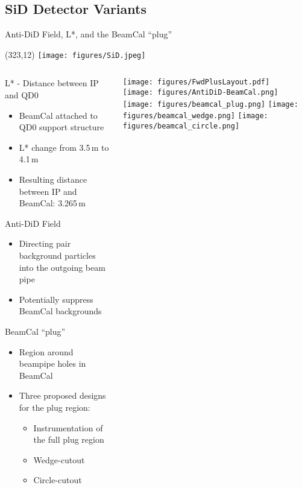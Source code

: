 \documentclass[xcolor={dvipsnames}]{beamer}
\newcommand{\sidlogo}{
  \setlength{\TPHorizModule}{1pt}
  \setlength{\TPVertModule}{1pt}
  \begin{textblock}{1}(323,12)
   \texttt{[image: figures/SiD.jpeg]}
  \end{textblock}
  }
\begin{document}

\subsection{SiD Detector Variants}
\begin{frame}{Anti-DiD Field, L*, and the BeamCal ``plug''}
\sidlogo
\begin{columns}
 \begin{column}{0.7\textwidth}
 \alert{L* - Distance between IP and QD0}
  \begin{itemize}
  \item BeamCal attached to QD0 support structure
  \item L* change from 3.5\,m to 4.1\,m
  \item Resulting distance between IP and BeamCal: 3.265\,m
 \end{itemize}
 \alert{Anti-DiD Field}
 \begin{itemize}
  \item Directing pair background particles into the outgoing beam pipe
  \item Potentially suppress BeamCal backgrounds
 \end{itemize}
 \alert{BeamCal ``plug''}
  \begin{itemize}
  \item Region around beampipe holes in BeamCal
  \item Three proposed designs for the plug region:
  \begin{itemize}
   \item Instrumentation of the full plug region
   \item Wedge-cutout
   \item Circle-cutout
  \end{itemize}
 \end{itemize}  
 \end{column}
 \begin{column}{0.35\textwidth}
  \texttt{[image: figures/FwdPlusLayout.pdf]}\\
  \vspace*{0.5cm}
  \texttt{[image: figures/AntiDiD-BeamCal.png]}\\
  \vspace*{0.5cm}
  \texttt{[image: figures/beamcal\_plug.png]}
  \texttt{[image: figures/beamcal\_wedge.png]}
  \texttt{[image: figures/beamcal\_circle.png]}
 \end{column}
\end{columns}

\end{frame}
\end{document}
